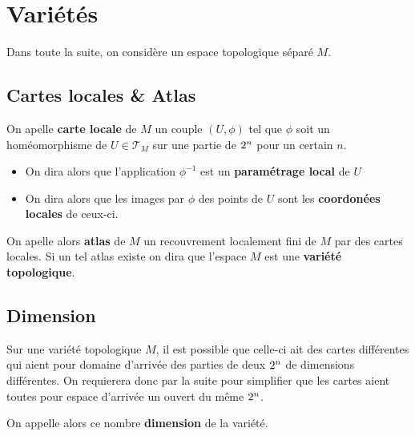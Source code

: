 \chapter{Variétés}
   Dans toute la suite, on considère un espace topologique séparé \( M \).
   \section{Cartes locales \& Atlas}
      On apelle \textbf{carte locale} de \( M \) un couple \( (U, \phi) \) tel que  \( \phi \) soit un homéomorphisme de \( U \in \mathcal{T}_M \) sur une partie de $2^n$ pour un certain \( n \).
      \begin{itemize}
         \item On dira alors que l'application \( \phi^{-1} \) est un \textbf{paramétrage local} de \( U \)
         \item On dira alors que les images par \( \phi \) des points de $U$ sont les \textbf{coordonées locales} de ceux-ci.
      \end{itemize}
   On apelle alors \textbf{atlas} de \( M \) un recouvrement localement fini de \( M \) par des cartes locales. Si un tel atlas existe on dira que l'espace \( M \) est une \textbf{variété topologique}. 
   \section{Dimension}
      Sur une variété topologique $M$, il est possible que celle-ci ait des cartes différentes qui aient pour domaine d'arrivée des parties de deux $2^n$ de dimensions différentes. On requierera donc par la suite pour simplifier que les cartes aient toutes pour espace d'arrivée un ouvert du même $2^n$.\<

      On appelle alors ce nombre \textbf{dimension} de la variété.
